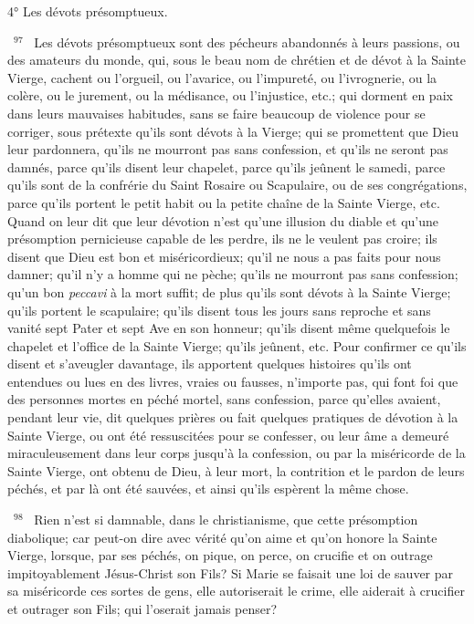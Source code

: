 \documentclass[paper=a5,pagesize=pdftex,fontsize=15pt,headinclude=on,twoside=off]{scrbook}
\newcommand{\negphantom}[1]{\settowidth{\dimen0}{#1}\hspace*{-\dimen0}}
\newcommand{\versenb}[1]{\par \vspace{10pt}~\negphantom{~${}^{#1}$~}${}^{#1}$~}
\newcommand{\latin}[1]{\emph{#1}}
\begin{document}
4° Les dévots présomptueux.
\versenb{97} Les dévots présomptueux sont des pécheurs abandonnés à leurs passions, ou des amateurs du monde, qui,
sous le beau nom de chrétien et de dévot à la Sainte Vierge, cachent ou l'orgueil, ou l'avarice, ou l'impureté, ou
l'ivrognerie, ou la colère, ou le jurement, ou la médisance, ou l'injustice, etc.; qui dorment en paix dans leurs
mauvaises habitudes, sans se faire beaucoup de violence pour se corriger, sous prétexte qu'ils sont dévots à la
Vierge; qui se promettent que Dieu leur pardonnera, qu'ils ne mourront pas sans confession, et qu'ils ne seront pas
damnés, parce qu'ils disent leur chapelet, parce qu'ils jeûnent le samedi, parce qu'ils sont de la confrérie du Saint
Rosaire ou Scapulaire, ou de ses congrégations, parce qu'ils portent le petit habit ou la petite chaîne de la Sainte
Vierge, etc.
Quand on leur dit que leur dévotion n'est qu'une illusion du diable et qu'une présomption pernicieuse capable de
les perdre, ils ne le veulent pas croire; ils disent que Dieu est bon et miséricordieux; qu'il ne nous a pas faits pour
nous damner; qu'il n'y a homme qui ne pèche; qu'ils ne mourront pas sans confession; qu'un bon \latin{peccavi} à la mort
suffit; de plus qu'ils sont dévots à la Sainte Vierge; qu'ils portent le scapulaire; qu'ils disent tous les jours sans
reproche et sans vanité sept Pater et sept Ave en son honneur; qu'ils disent même quelquefois le chapelet et
l'office de la Sainte Vierge; qu'ils jeûnent, etc. Pour confirmer ce qu'ils disent et s'aveugler davantage, ils apportent
quelques histoires qu'ils ont entendues ou lues en des livres, vraies ou fausses, n'importe pas, qui font foi que des
personnes mortes en péché mortel, sans confession, parce qu'elles avaient, pendant leur vie, dit quelques prières
ou fait quelques pratiques de dévotion à la Sainte Vierge, ou ont été ressuscitées pour se confesser, ou leur âme a
demeuré miraculeusement dans leur corps jusqu'à la confession, ou par la miséricorde de la Sainte Vierge, ont
obtenu de Dieu, à leur mort, la contrition et le pardon de leurs péchés, et par là ont été sauvées, et ainsi qu'ils
espèrent la même chose.
\versenb{98} Rien n'est si damnable, dans le christianisme, que cette présomption diabolique; car peut-on dire avec vérité
qu'on aime et qu'on honore la Sainte Vierge, lorsque, par ses péchés, on pique, on perce, on crucifie et on outrage
impitoyablement Jésus-Christ son Fils? Si Marie se faisait une loi de sauver par sa miséricorde ces sortes de gens,
elle autoriserait le crime, elle aiderait à crucifier et outrager son Fils; qui l'oserait jamais penser?
\end{document}
